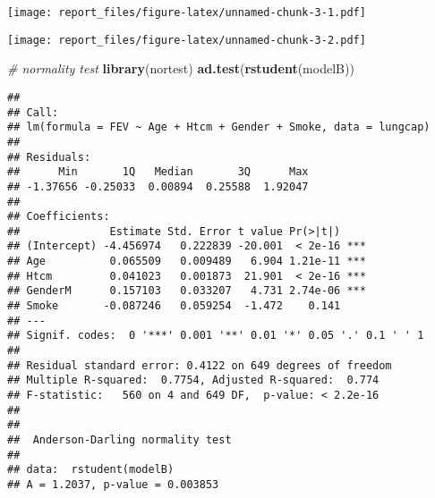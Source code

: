 \documentclass[]{article}
\newenvironment{Shaded}{\begin{snugshade}}{\end{snugshade}}
\newcommand{\KeywordTok}[1]{\textcolor[rgb]{0.13,0.29,0.53}{\textbf{#1}}}
\newcommand{\DataTypeTok}[1]{\textcolor[rgb]{0.13,0.29,0.53}{#1}}
\newcommand{\DecValTok}[1]{\textcolor[rgb]{0.00,0.00,0.81}{#1}}
\newcommand{\StringTok}[1]{\textcolor[rgb]{0.31,0.60,0.02}{#1}}
\newcommand{\CommentTok}[1]{\textcolor[rgb]{0.56,0.35,0.01}{\textit{#1}}}
\newcommand{\OperatorTok}[1]{\textcolor[rgb]{0.81,0.36,0.00}{\textbf{#1}}}
\newcommand{\NormalTok}[1]{#1}
\begin{document}
\texttt{[image: report\_files/figure-latex/unnamed-chunk-3-1.pdf]}

\begin{Shaded}
\end{Shaded}

\texttt{[image: report\_files/figure-latex/unnamed-chunk-3-2.pdf]}

\begin{Shaded}
\begin{Highlighting}[]
\CommentTok{# normality test}
\KeywordTok{library}\NormalTok{(nortest) }
\KeywordTok{ad.test}\NormalTok{(}\KeywordTok{rstudent}\NormalTok{(modelB))}
\end{Highlighting}
\end{Shaded}

\begin{verbatim}
## 
## Call:
## lm(formula = FEV ~ Age + Htcm + Gender + Smoke, data = lungcap)
## 
## Residuals:
##      Min       1Q   Median       3Q      Max 
## -1.37656 -0.25033  0.00894  0.25588  1.92047 
## 
## Coefficients:
##              Estimate Std. Error t value Pr(>|t|)    
## (Intercept) -4.456974   0.222839 -20.001  < 2e-16 ***
## Age          0.065509   0.009489   6.904 1.21e-11 ***
## Htcm         0.041023   0.001873  21.901  < 2e-16 ***
## GenderM      0.157103   0.033207   4.731 2.74e-06 ***
## Smoke       -0.087246   0.059254  -1.472    0.141    
## ---
## Signif. codes:  0 '***' 0.001 '**' 0.01 '*' 0.05 '.' 0.1 ' ' 1
## 
## Residual standard error: 0.4122 on 649 degrees of freedom
## Multiple R-squared:  0.7754, Adjusted R-squared:  0.774 
## F-statistic:   560 on 4 and 649 DF,  p-value: < 2.2e-16
## 
## 
##  Anderson-Darling normality test
## 
## data:  rstudent(modelB)
## A = 1.2037, p-value = 0.003853
\end{verbatim}
\end{document}
